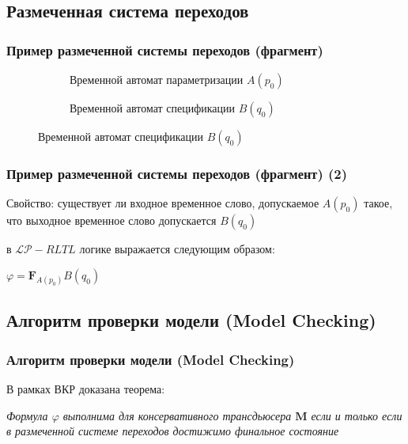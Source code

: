 \documentclass{beamer}
\begin{document}
\subsection{Размеченная система переходов}

\begin{frame}
\frametitle{Пример размеченной системы переходов (фрагмент)}

\begin{figure}
\centering
\begin{subfigure}{.5\textwidth}
  \centering
  \caption{Временной автомат параметризации $A(p_0)$}
\end{subfigure}%
\begin{subfigure}{.5\textwidth}
  \centering
  \caption{Временной автомат спецификации $B(q_0)$}
\end{subfigure}
\end{figure}



\end{frame}

\begin{frame}
\frametitle{Пример размеченной системы переходов (фрагмент) (2)}

Свойство: существует ли входное временное слово, допускаемое $A(p_0)$ такое, что выходное временное слово допускается $B(q_0)$ 

в $\mathcal{LP}-RLTL$ логике выражается следующим образом:

$\varphi = \mathbf{F}_{A(p_0)}B(q_0)$



\end{frame}

\subsection{Алгоритм проверки модели (Model Checking)}

\begin{frame}
\frametitle{Алгоритм проверки модели (Model Checking)}

В рамках ВКР доказана теорема: 
\begin{theorem}
{\itshape
Формула $\varphi$ выполнима для консервативного трансдьюсера $\textbf{M}$ если и только если в размеченной системе переходов достижимо финальное состояние
}
\end{theorem}

\end{frame}
\end{document}
